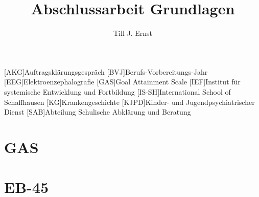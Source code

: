 


\title{Abschlussarbeit Grundlagen}
\author{Till J. Ernst}






\tableofcontents
\newpage

\begin{acronym}[KJPD]
[AKG]{Auftragsklärungsgespräch}
[BVJ]{Berufs-Vorbereitungs-Jahr}
[EEG]{Elektroenzephalografie}
[GAS]{Goal Attainment Scale}
[IEF]{Institut für systemische Entwicklung und Fortbildung}
[IS-SH]{International School of Schaffhausen}
[KG]{Krankengeschichte}
[KJPD]{Kinder- und Jugendpsychiatrischer Dienst}
[SAB]{Abteilung Schulische Abklärung und Beratung}
\end{acronym}
\newpage













\renewcommand{\appendixtocname}{Anhang}
\renewcommand{\appendixname}{Anhang}
\renewcommand{\appendixpagename}{Anhang}

\newpage
\appendixpage
\addappheadtotoc
\section{GAS} \label{app:gas}
\section{EB-45} \label{app:eb45}


\newpage
\begin{flushleft}
{}
\end{flushleft}


%
%
%